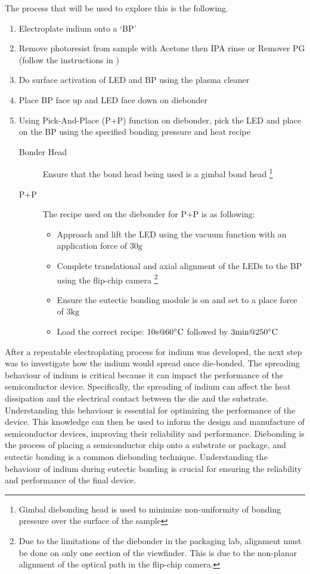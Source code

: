 The process that will be used to explore this is the following.
\begin{enumerate}
    \item Electroplate indium onto a `BP'
    \item Remove photoresist from sample with Acetone then IPA rinse or Remover PG (follow the instructions in \cite{RemoverPGds})
    \item Do surface activation of LED and BP using the plasma cleaner
    \item Place BP face up and LED face down on diebonder
    \item Using Pick-And-Place (P+P) function on diebonder, pick the LED and place on the BP using the specified bonding pressure and heat recipe
    \begin{description}
        \item[Bonder Head] Ensure that the bond head being used is a gimbal bond head \footnote{Gimbal diebonding head is used to minimize non-uniformity of bonding pressure over the surface of the sample}
        \item[P+P] The recipe used on the diebonder for P+P is as following: \begin{itemize}
            \item Approach and lift the LED using the vacuum function with an application force of $30\unit{\gram}$
            \item Complete translational and axial alignment of the LEDs to the BP using the flip-chip camera \footnote{Due to the limitations of the diebonder in the packaging lab, alignment must be done on only one section of the viewfinder. This is due to the non-planar alignment of the optical path in the flip-chip camera.}
            \item Ensure the eutectic bonding module is on and set to a place force of $3\unit{\kilo\gram}$
            \item Load the correct recipe: $10\unit{\second} \text{@} 60\dC$ followed by $3\unit{\minute} \text{@} 250\dC$
        \end{itemize}
    \end{description}
\end{enumerate}

After a repeatable electroplating process for indium was developed, the next step was to investigate how the indium would spread once die-bonded. The spreading behaviour of indium is critical because it can impact the performance of the semiconductor device. Specifically, the spreading of indium can affect the heat dissipation and the electrical contact between the die and the substrate. Understanding this behaviour is essential for optimizing the performance of the device.
This knowledge can then be used to inform the design and manufacture of semiconductor devices, improving their reliability and performance.
Diebonding is the process of placing a semiconductor chip onto a substrate or package, and eutectic bonding is a common diebonding technique. Understanding the behaviour of indium during eutectic bonding is crucial for ensuring the reliability and performance of the final device.

